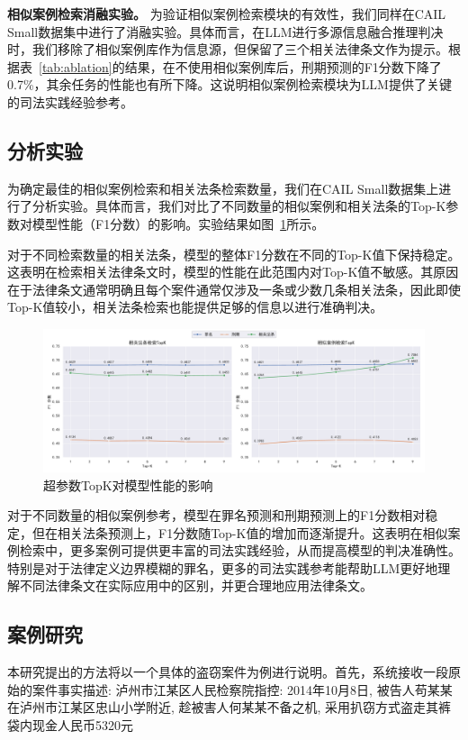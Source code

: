 \textbf{相似案例检索消融实验。}
为验证相似案例检索模块的有效性，我们同样在CAIL Small数据集中进行了消融实验。具体而言，在LLM进行多源信息融合推理判决时，我们移除了相似案例库作为信息源，但保留了三个相关法律条文作为提示。根据表~\ref{tab:ablation}的结果，在不使用相似案例库后，刑期预测的F1分数下降了0.7\%，其余任务的性能也有所下降。这说明相似案例检索模块为LLM提供了关键的司法实践经验参考。


\subsection{\heiti 分析实验}
为确定最佳的相似案例检索和相关法条检索数量，我们在CAIL Small数据集上进行了分析实验。具体而言，我们对比了不同数量的相似案例和相关法条的Top-K参数对模型性能（F1分数）的影响。实验结果如图~\ref{fig:analysis}所示。


对于不同检索数量的相关法条，模型的整体F1分数在不同的Top-K值下保持稳定。这表明在检索相关法律条文时，模型的性能在此范围内对Top-K值不敏感。其原因在于法律条文通常明确且每个案件通常仅涉及一条或少数几条相关法条，因此即使Top-K值较小，相关法条检索也能提供足够的信息以进行准确判决。
\begin{figure}[htpb]
	\centering
	\includegraphics[width=1\linewidth]{fig/analysis.pdf}
	\caption{超参数TopK对模型性能的影响}
	\label{fig:analysis}
\end{figure}

对于不同数量的相似案例参考，模型在罪名预测和刑期预测上的F1分数相对稳定，但在相关法条预测上，F1分数随Top-K值的增加而逐渐提升。这表明在相似案例检索中，更多案例可提供更丰富的司法实践经验，从而提高模型的判决准确性。特别是对于法律定义边界模糊的罪名，更多的司法实践参考能帮助LLM更好地理解不同法律条文在实际应用中的区别，并更合理地应用法律条文。

\subsection{\heiti 案例研究}

本研究提出的方法将以一个具体的盗窃案件为例进行说明。首先，系统接收一段原始的案件事实描述:
	泸州市江某区人民检察院指控: 2014年10月8日, 被告人苟某某在泸州市江某区忠山小学附近, 趁被害人何某某不备之机, 采用扒窃方式盗走其裤袋内现金人民币5320元


